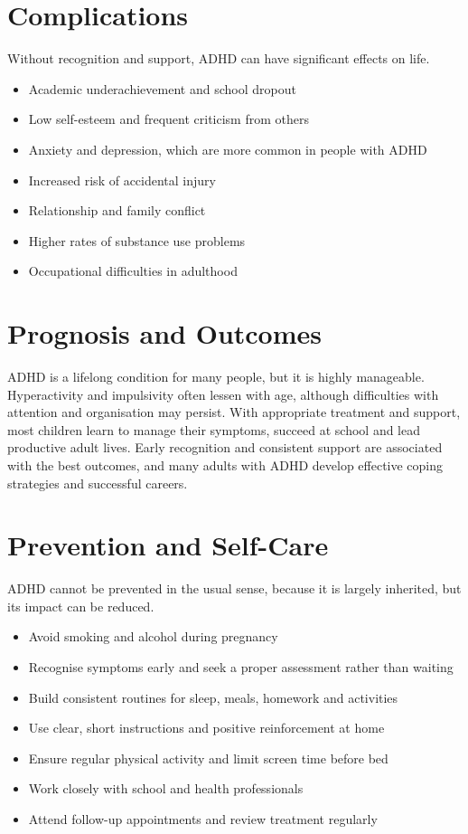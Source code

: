 \section*{Complications}
Without recognition and support, ADHD can have significant effects on life.

\begin{itemize}
    \item Academic underachievement and school dropout
    \item Low self-esteem and frequent criticism from others
    \item Anxiety and depression, which are more common in people with ADHD
    \item Increased risk of accidental injury
    \item Relationship and family conflict
    \item Higher rates of substance use problems
    \item Occupational difficulties in adulthood
\end{itemize}

\section*{Prognosis and Outcomes}
ADHD is a lifelong condition for many people, but it is highly manageable. Hyperactivity and impulsivity often lessen with age, although difficulties with attention and organisation may persist. With appropriate treatment and support, most children learn to manage their symptoms, succeed at school and lead productive adult lives. Early recognition and consistent support are associated with the best outcomes, and many adults with ADHD develop effective coping strategies and successful careers.

\section*{Prevention and Self-Care}
ADHD cannot be prevented in the usual sense, because it is largely inherited, but its impact can be reduced.

\begin{itemize}
    \item Avoid smoking and alcohol during pregnancy
    \item Recognise symptoms early and seek a proper assessment rather than waiting
    \item Build consistent routines for sleep, meals, homework and activities
    \item Use clear, short instructions and positive reinforcement at home
    \item Ensure regular physical activity and limit screen time before bed
    \item Work closely with school and health professionals
    \item Attend follow-up appointments and review treatment regularly
\end{itemize}

